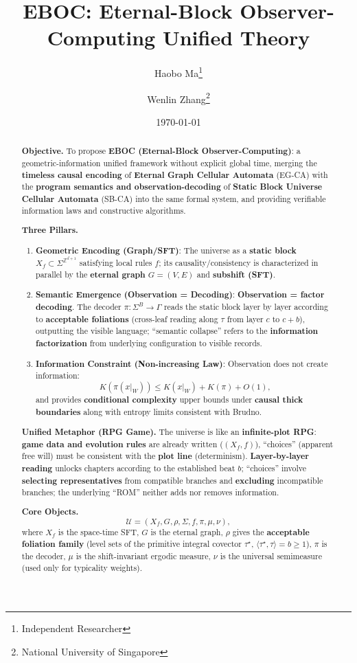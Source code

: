 \documentclass[11pt]{article}
\title{EBOC: Eternal-Block Observer-Computing Unified Theory}
\author{Haobo Ma\thanks{Independent Researcher} \and Wenlin Zhang\thanks{National University of Singapore}}
\date{\today}
\theoremstyle{definition}
\theoremstyle{remark}
\begin{document}
\maketitle

\begin{abstract}
\noindent\textbf{Objective.} To propose \textbf{EBOC (Eternal-Block Observer-Computing)}: a geometric-information unified framework without explicit global time, merging the \textbf{timeless causal encoding} of \textbf{Eternal Graph Cellular Automata} (EG-CA) with the \textbf{program semantics and observation-decoding} of \textbf{Static Block Universe Cellular Automata} (SB-CA) into the same formal system, and providing verifiable information laws and constructive algorithms.

\noindent\textbf{Three Pillars.}
\begin{enumerate}
\item \textbf{Geometric Encoding (Graph/SFT)}: The universe as a \textbf{static block} \( X_f \subset \Sigma^{\mathbb{Z}^{d+1}} \) satisfying local rules \( f \); its causality/consistency is characterized in parallel by the \textbf{eternal graph} \( G=(V,E) \) and \textbf{subshift (SFT)}.
\item \textbf{Semantic Emergence (Observation = Decoding)}: \textbf{Observation = factor decoding}. The decoder \( \pi: \Sigma^B \to \Gamma \) reads the static block layer by layer according to \textbf{acceptable foliations} (cross-leaf reading along \( \tau \) from layer \( c \) to \( c+b \)), outputting the visible language; ``semantic collapse'' refers to the \textbf{information factorization} from underlying configuration to visible records.
\item \textbf{Information Constraint (Non-increasing Law)}: Observation does not create information:
\[
K(\pi(x|_W)) \leq K(x|_W) + K(\pi) + O(1),
\]
and provides \textbf{conditional complexity} upper bounds under \textbf{causal thick boundaries} along with entropy limits consistent with Brudno.
\end{enumerate}

\noindent\textbf{Unified Metaphor (RPG Game).} The universe is like an \textbf{infinite-plot RPG}: \textbf{game data and evolution rules} are already written (\( (X_f, f) \)), ``choices'' (apparent free will) must be consistent with the \textbf{plot line} (determinism). \textbf{Layer-by-layer reading} unlocks chapters according to the established beat \( b \); ``choices'' involve \textbf{selecting representatives} from compatible branches and \textbf{excluding} incompatible branches; the underlying ``ROM'' neither adds nor removes information.

\noindent\textbf{Core Objects.}
\[
\mathcal{U} = (X_f, G, \rho, \Sigma, f, \pi, \mu, \nu),
\]
where \( X_f \) is the space-time SFT, \( G \) is the eternal graph, \( \rho \) gives the \textbf{acceptable foliation family} (level sets of the primitive integral covector \( \tau^\star \), \( \langle\tau^\star, \tau\rangle = b \geq 1 \)), \( \pi \) is the decoder, \( \mu \) is the shift-invariant ergodic measure, \( \nu \) is the universal semimeasure (used only for typicality weights).
\end{abstract}
\end{document}
